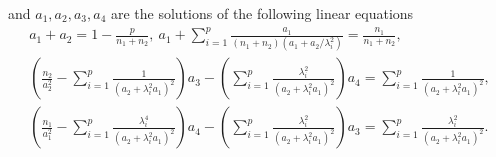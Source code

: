 %
%
	and $a_1, a_2, a_3, a_4$ are the solutions of the following linear equations
	\begin{gather}
		 a_1 + a_2 = 1- \frac{p}{n_1 + n_2},~ a_1 + \sum_{i=1}^p \frac{a_1}{(n_1 + n_2)(a_1 + a_2/ \lambda_i^2)} = \frac{n_1}{n_1 + n_2}, \label{eq_a2} \\
		\left(\frac{n_2}{a_2^2}- \sum_{i=1}^p \frac{1}{ (a_2 + \lambda_i^2a_1)^2  }\right) a_3 -  \left(\sum_{i=1}^p \frac{  \lambda_i^2 }{ (  a_2 + \lambda_i^2a_1)^2  }\right)a_4
		= \sum_{i=1}^p \frac{1 }{ (  a_2 + \lambda_i^2a_1)^2  }, \label{eq_a3} \\
		\left(\frac{n_1}{a_1^2} -  \sum_{i=1}^p \frac{\lambda_i^4   }{  (a_2 + \lambda_i^2a_1)^2  }\right)a_4 -\left(\sum_{i=1}^p \frac{\lambda_i^2  }{  (a_2 + \lambda_i^2a_1)^2  }\right)a_3
		= \sum_{i=1}^p \frac{\lambda_i^2 }{  (a_2 + \lambda_i^2a_1)^2  }. \label{eq_a4}
	\end{gather}

